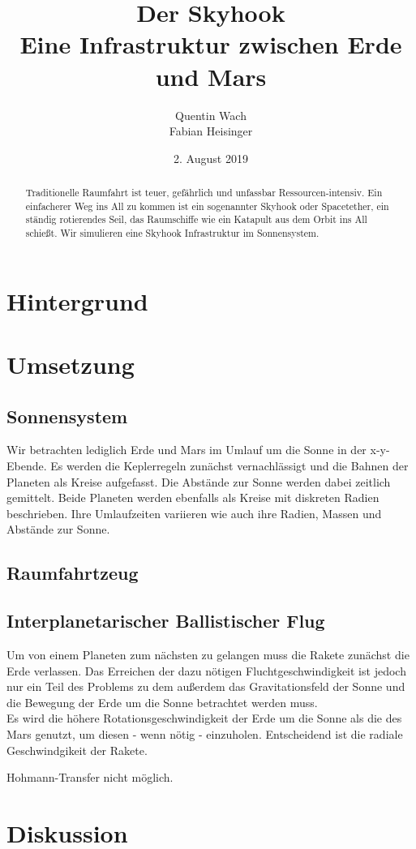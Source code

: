 \documentclass{article}
\title{ \textbf{Der Skyhook} \\ \textmd{Eine Infrastruktur zwischen Erde und Mars}}  %
\author{
  Quentin Wach \\
  Fabian Heisinger
  \date{2. August 2019}
}
\begin{document}
\maketitle
\begin{abstract}
Traditionelle Raumfahrt ist teuer, gefährlich und unfassbar Ressourcen-intensiv. Ein einfacherer Weg  ins All zu kommen ist ein sogenannter Skyhook oder Spacetether,  ein ständig rotierendes Seil, das Raumschiffe wie ein Katapult aus dem Orbit ins All schießt. Wir simulieren eine Skyhook Infrastruktur im Sonnensystem.
\end{abstract}

\section{Hintergrund}

\section{Umsetzung}
\subsection{Sonnensystem}
Wir betrachten lediglich Erde und Mars im Umlauf um die Sonne in der x-y-Ebende. Es werden die Keplerregeln zunächst vernachlässigt und die Bahnen der Planeten als Kreise aufgefasst. Die Abstände zur Sonne werden dabei zeitlich gemittelt. Beide Planeten werden ebenfalls als Kreise mit diskreten Radien beschrieben. Ihre Umlaufzeiten variieren wie auch ihre Radien, Massen und Abstände zur Sonne.  
\subsection{Raumfahrtzeug}
\subsection{Interplanetarischer Ballistischer Flug}
Um von einem Planeten zum nächsten zu gelangen muss die Rakete zunächst die Erde verlassen. Das Erreichen der dazu nötigen Fluchtgeschwindigkeit ist jedoch nur ein Teil des Problems zu dem außerdem das Gravitationsfeld der Sonne und die Bewegung der Erde um die Sonne betrachtet werden muss. \\

Es wird die höhere Rotationsgeschwindigkeit der Erde um die Sonne als die des Mars genutzt, um diesen - wenn nötig - einzuholen. Entscheidend ist die radiale Geschwindgikeit der Rakete.

Hohmann-Transfer nicht möglich.
\section{Diskussion}
\end{document}
